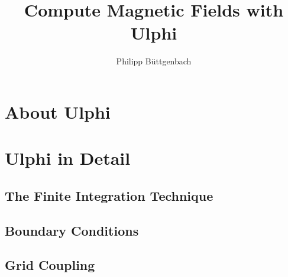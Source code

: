 %
%
%
%
%


\title{Compute Magnetic Fields with Ulphi}
\author{Philipp Büttgenbach}
\subject{Compute Magnetic Fields}













\section{About Ulphi}




\section{Ulphi in Detail}
\subsection{The Finite Integration Technique}




\subsection{Boundary Conditions}




\subsection{Grid Coupling}

